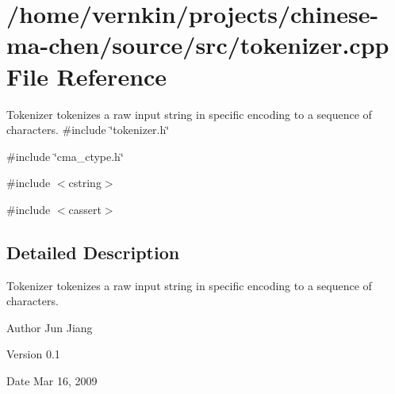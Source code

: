 \section{/home/vernkin/projects/chinese-\/ma-\/chen/source/src/tokenizer.cpp File Reference}
\label{tokenizer_8cpp}


Tokenizer tokenizes a raw input string in specific encoding to a sequence of characters.  
{\ttfamily \#include \char`\"{}tokenizer.h\char`\"{}}\par
{\ttfamily \#include \char`\"{}cma\_\-ctype.h\char`\"{}}\par
{\ttfamily \#include $<$cstring$>$}\par
{\ttfamily \#include $<$cassert$>$}\par


\subsection{Detailed Description}
Tokenizer tokenizes a raw input string in specific encoding to a sequence of characters. \begin{DoxyAuthor}{Author}
Jun Jiang 
\end{DoxyAuthor}
\begin{DoxyVersion}{Version}
0.1 
\end{DoxyVersion}
\begin{DoxyDate}{Date}
Mar 16, 2009 
\end{DoxyDate}

